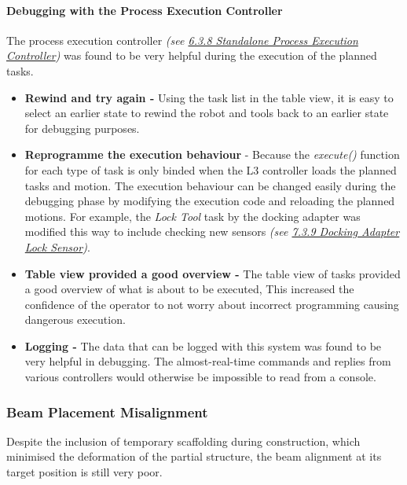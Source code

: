 \documentclass[11pt]{book}
\begin{document}
\paragraph{Debugging with the Process Execution Controller}

The process execution controller \textit{\textcolor[HTML]{B7B7B7}{(see \uline{6.3.8 Standalone Process Execution Controller})}} was found to be very helpful during the execution of the planned tasks. 

\begin{itemize}
	\item \textbf{Rewind and try again - }Using the task list in the table view, it is easy to select an earlier state to rewind the robot and tools back to an earlier state for debugging purposes.

	\item \textbf{Reprogramme the execution behaviour} - Because the \textit{execute() }function for each type of task is only binded when the L3 controller loads the planned tasks and motion. The execution behaviour can be changed easily during the debugging phase by modifying the execution code and reloading the planned motions. For example, the \textit{Lock Tool }task by the docking adapter was modified this way to include checking new sensors \textit{\textcolor[HTML]{B7B7B7}{(see \uline{7.3.9 Docking Adapter Lock Sensor})}}.

	\item \textbf{Table view provided a good overview - }The table view of tasks provided a good overview of what is about to be executed, This increased the confidence of the operator to not worry about incorrect programming causing dangerous execution.

	\item \textbf{Logging - }The data that can be logged with this system was found to be very helpful in debugging. The almost-real-time commands and replies from various controllers would otherwise be impossible to read from a console.

\end{itemize}
\subsubsection{Beam Placement Misalignment}

Despite the inclusion of temporary scaffolding during construction, which minimised the deformation of the partial structure, the beam alignment at its target position is still very poor.
\end{document}
